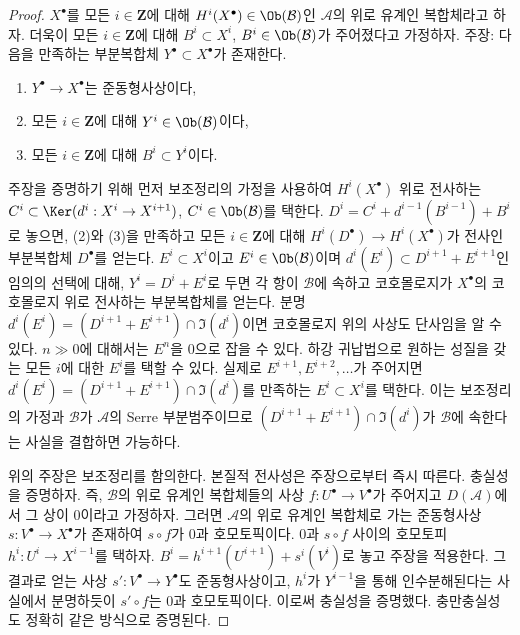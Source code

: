 \begin{proof}
$X^\bullet$를 모든 $i \in \mathbf{Z}$에 대해
$H^i(X^\bullet) \in \Ob(\mathcal{B})$인 $\mathcal{A}$의 위로 유계인
복합체라고 하자. 더욱이 모든 $i \in \mathbf{Z}$에 대해
$B^i \subset X^i$, $B^i \in \Ob(\mathcal{B})$가 주어졌다고 가정하자.
주장: 다음을 만족하는 부분복합체 $Y^\bullet \subset X^\bullet$가 존재한다.
\begin{enumerate}
\item $Y^\bullet \to X^\bullet$는 준동형사상이다,
\item 모든 $i \in \mathbf{Z}$에 대해 $Y^i \in \Ob(\mathcal{B})$이다,
\item 모든 $i \in \mathbf{Z}$에 대해 $B^i \subset Y^i$이다.
\end{enumerate}
주장을 증명하기 위해 먼저 보조정리의 가정을 사용하여
$H^i(X^\bullet)$ 위로 전사하는
$C^i \subset \Ker(d^i : X^i \to X^{i + 1})$,
$C^i \in \Ob(\mathcal{B})$를 택한다.
$D^i = C^i + d^{i - 1}(B^{i - 1}) + B^i$로 놓으면, (2)와 (3)을
만족하고 모든 $i \in \mathbf{Z}$에 대해
$H^i(D^\bullet) \to H^i(X^\bullet)$가 전사인 부분복합체
$D^\bullet$를 얻는다. $E^i \subset X^i$이고
$E^i \in \Ob(\mathcal{B})$이며
$d^i(E^i) \subset D^{i + 1} + E^{i + 1}$인 임의의 선택에 대해,
$Y^i = D^i + E^i$로 두면 각 항이 $\mathcal{B}$에 속하고 코호몰로지가
$X^\bullet$의 코호몰로지 위로 전사하는 부분복합체를 얻는다.
분명 $d^i(E^i) = (D^{i + 1} + E^{i + 1}) \cap \Im(d^i)$이면
코호몰로지 위의 사상도 단사임을 알 수 있다. $n \gg 0$에 대해서는
$E^n$을 $0$으로 잡을 수 있다. 하강 귀납법으로 원하는 성질을 갖는
모든 $i$에 대한 $E^i$를 택할 수 있다. 실제로
$E^{i + 1}, E^{i + 2}, \ldots$가 주어지면
$d^i(E^i) = (D^{i + 1} + E^{i + 1}) \cap \Im(d^i)$를 만족하는
$E^i \subset X^i$를 택한다. 이는 보조정리의 가정과
$\mathcal{B}$가 $\mathcal{A}$의 Serre 부분범주이므로
$(D^{i + 1} + E^{i + 1}) \cap \Im(d^i)$가 $\mathcal{B}$에 속한다는
사실을 결합하면 가능하다.

\medskip\noindent
위의 주장은 보조정리를 함의한다. 본질적 전사성은 주장으로부터
즉시 따른다. 충실성을 증명하자. 즉, $\mathcal{B}$의 위로 유계인
복합체들의 사상 $f : U^\bullet \to V^\bullet$가 주어지고
$D(\mathcal{A})$에서 그 상이 0이라고 가정하자. 그러면
$\mathcal{A}$의 위로 유계인 복합체로 가는 준동형사상
$s : V^\bullet \to X^\bullet$가 존재하여 $s \circ f$가 0과
호모토픽이다. $0$과 $s \circ f$ 사이의 호모토피
$h^i : U^i \to X^{i - 1}$를 택하자.
$B^i = h^{i + 1}(U^{i + 1}) + s^i(V^i)$로 놓고 주장을 적용한다.
그 결과로 얻는 사상 $s' : V^\bullet \to Y^\bullet$도 준동형사상이고,
$h^i$가 $Y^{i - 1}$을 통해 인수분해된다는 사실에서 분명하듯이
$s' \circ f$는 0과 호모토픽이다. 이로써 충실성을 증명했다.
충만충실성도 정확히 같은 방식으로 증명된다.
\end{proof}





